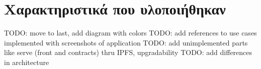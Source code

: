 \section{Χαρακτηριστικά που υλοποιήθηκαν}

TODO: move to last, add diagram with colors
TODO: add references to use cases implemented with screenshots of application
TODO: add unimplemented parts like serve (front and contracts) thru IPFS, upgradability
TODO: add differences in architecture
